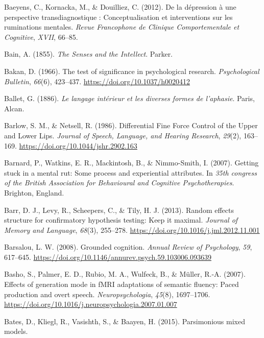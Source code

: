 \documentclass[a4paper,12pt,twoside,openright,oldfontcommands]{memoir}
\begin{document}
\leavevmode\hypertarget{ref-Baeyens2012}{}%
Baeyens, C., Kornacka, M., \& Douilliez, C. (2012). De la dépression à une perspective transdiagnostique : Conceptualisation et interventions sur les ruminations mentales. \emph{Revue Francophone de Clinique Comportementale et Cognitive}, \emph{XVII}, 66--85.

\leavevmode\hypertarget{ref-bain_senses_1855}{}%
Bain, A. (1855). \emph{The Senses and the Intellect}. Parker.

\leavevmode\hypertarget{ref-bakan_test_1966}{}%
Bakan, D. (1966). The test of significance in psychological research. \emph{Psychological Bulletin}, \emph{66}(6), 423--437. \url{https://doi.org/10.1037/h0020412}

\leavevmode\hypertarget{ref-ballet_langage_1886}{}%
Ballet, G. (1886). \emph{Le langage intérieur et les diverses formes de l'aphasie}. Paris, Alcan.

\leavevmode\hypertarget{ref-barlow_differential_1986}{}%
Barlow, S. M., \& Netsell, R. (1986). Differential Fine Force Control of the Upper and Lower Lips. \emph{Journal of Speech, Language, and Hearing Research}, \emph{29}(2), 163--169. \url{https://doi.org/10.1044/jshr.2902.163}

\leavevmode\hypertarget{ref-barnard_getting_2007}{}%
Barnard, P., Watkins, E. R., Mackintosh, B., \& Nimmo-Smith, I. (2007). Getting stuck in a mental rut: Some process and experiential attributes. In \emph{35th congress of the British Association for Behavioural and Cognitive Psychotherapies}. Brighton, England.

\leavevmode\hypertarget{ref-barr_random_2013-1}{}%
Barr, D. J., Levy, R., Scheepers, C., \& Tily, H. J. (2013). Random effects structure for confirmatory hypothesis testing: Keep it maximal. \emph{Journal of Memory and Language}, \emph{68}(3), 255--278. \url{https://doi.org/10.1016/j.jml.2012.11.001}

\leavevmode\hypertarget{ref-Barsalou2008}{}%
Barsalou, L. W. (2008). Grounded cognition. \emph{Annual Review of Psychology}, \emph{59}, 617--645. \url{https://doi.org/10.1146/annurev.psych.59.103006.093639}

\leavevmode\hypertarget{ref-basho_effects_2007}{}%
Basho, S., Palmer, E. D., Rubio, M. A., Wulfeck, B., \& Müller, R.-A. (2007). Effects of generation mode in fMRI adaptations of semantic fluency: Paced production and overt speech. \emph{Neuropsychologia}, \emph{45}(8), 1697--1706. \url{https://doi.org/10.1016/j.neuropsychologia.2007.01.007}

\leavevmode\hypertarget{ref-bates_parsimonious_2015}{}%
Bates, D., Kliegl, R., Vasishth, S., \& Baayen, H. (2015). Parsimonious mixed models.
\end{document}
